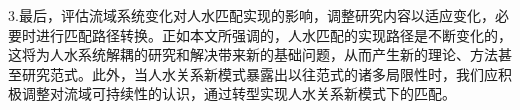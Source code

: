 3.最后，评估流域系统变化对人水匹配实现的影响，调整研究内容以适应变化，必要时进行匹配路径转换。正如本文所强调的，人水匹配的实现路径是不断变化的，这将为人水系统解耦的研究和解决带来新的基础问题，从而产生新的理论、方法甚至研究范式。此外，当人水关系新模式暴露出以往范式的诸多局限性时，我们应积极调整对流域可持续性的认识，通过转型实现人水关系新模式下的匹配。



